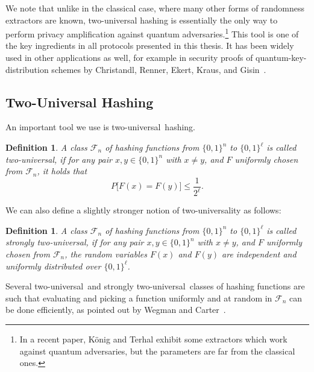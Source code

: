 \documentclass[final,11pt,a4paper]{report}
\newtheorem{definition}[theorem]{Definition}
\newcommand*{\nbit}{\set{0,1}^n}
\newcommand*{\set}[1]{\{#1\}}          %
\renewcommand*{\P}{P}            %
\newcommand*{\univ}{two-universal\xspace}
\newcommand*{\chf}[1]{\ensuremath{\mathcal{F}_{#1}}} %
\begin{document}
We note that unlike in the classical case,
where many other forms of randomness extractors are known,
two-universal hashing is essentially the only way to perform privacy
amplification against quantum adversaries.\footnote{In a recent paper, K\"onig
and Terhal \cite{KT06} exhibit some extractors which work against
quantum adversaries, but the parameters are far from the classical
ones.} This tool is one of the key ingredients in all protocols
presented in this thesis. It has been widely used in other
applications as well, for example in security proofs of
quantum-key-distribution schemes by Christandl, Renner, Ekert,
Kraus, and Gisin~\cite{CRE04, KGR05, RGK05, Renner05}.



\subsection{Two-Universal Hashing}
An important tool we use is \univ\ hashing.
\begin{definition} \label{def:two-universal}
A class \chf{n} of hashing functions from $\nbit$ to $\set{0,1}^{\ell}$ is 
called {\em \univ}, if for any pair $x, y\in\{0,1\}^n$ with $x \neq y$,
and $F$ uniformly chosen from \chf{n}, it holds that
\[
\P\bigl[F(x)=F(y)\bigr] \leq \frac{1}{2^{\ell}}.
\]
\end{definition}
We can also define a slightly stronger notion of two-universality as follows:
\begin{definition} \label{def:strongly-two-universal}
  A class \chf{n} of hashing functions from $\nbit$ to
  $\set{0,1}^{\ell}$ is called {\em strongly \univ}, if for any pair
  $x, y\in\{0,1\}^n$ with $x \neq y$, and $F$ uniformly chosen from
  \chf{n}, the random variables $F(x)$ and $F(y)$ are independent and
  uniformly distributed over $\set{0,1}^\ell$.
\end{definition}
Several \univ\ and strongly \univ\ classes of hashing functions are
such that evaluating and picking a function uniformly and at random in
$\chf{n}$ can be done efficiently, as pointed out by Wegman and Carter~\cite{WC77,WC79}.
\end{document}
